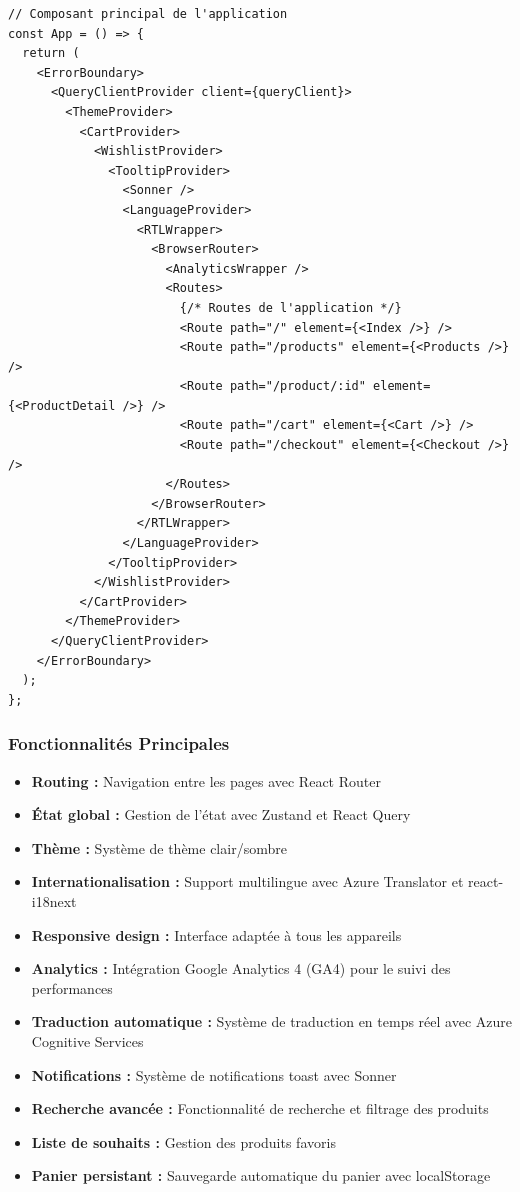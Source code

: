 \documentclass[12pt,a4paper]{article}
\begin{document}
\begin{lstlisting}[caption=Structure des composants React]
// Composant principal de l'application
const App = () => {
  return (
    <ErrorBoundary>
      <QueryClientProvider client={queryClient}>
        <ThemeProvider>
          <CartProvider>
            <WishlistProvider>
              <TooltipProvider>
                <Sonner />
                <LanguageProvider>
                  <RTLWrapper>
                    <BrowserRouter>
                      <AnalyticsWrapper />
                      <Routes>
                        {/* Routes de l'application */}
                        <Route path="/" element={<Index />} />
                        <Route path="/products" element={<Products />} />
                        <Route path="/product/:id" element={<ProductDetail />} />
                        <Route path="/cart" element={<Cart />} />
                        <Route path="/checkout" element={<Checkout />} />
                      </Routes>
                    </BrowserRouter>
                  </RTLWrapper>
                </LanguageProvider>
              </TooltipProvider>
            </WishlistProvider>
          </CartProvider>
        </ThemeProvider>
      </QueryClientProvider>
    </ErrorBoundary>
  );
};
\end{lstlisting}

\subsubsection{Fonctionnalités Principales}
\begin{itemize}
    \item \textbf{Routing :} Navigation entre les pages avec React Router
    \item \textbf{État global :} Gestion de l'état avec Zustand et React Query
    \item \textbf{Thème :} Système de thème clair/sombre
    \item \textbf{Internationalisation :} Support multilingue avec Azure Translator et react-i18next
    \item \textbf{Responsive design :} Interface adaptée à tous les appareils
    \item \textbf{Analytics :} Intégration Google Analytics 4 (GA4) pour le suivi des performances
    \item \textbf{Traduction automatique :} Système de traduction en temps réel avec Azure Cognitive Services
    \item \textbf{Notifications :} Système de notifications toast avec Sonner
    \item \textbf{Recherche avancée :} Fonctionnalité de recherche et filtrage des produits
    \item \textbf{Liste de souhaits :} Gestion des produits favoris
    \item \textbf{Panier persistant :} Sauvegarde automatique du panier avec localStorage
\end{itemize}
\end{document}
